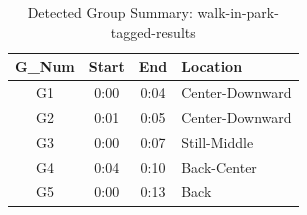 \begin{table}[H]
    \centering
    \caption{Detected Group Summary: walk-in-park-tagged-results}
    \label{tab:group-summary-4}
    \begin{tabular}{c c c l}
        \toprule
        \textbf{G\_Num} & \textbf{Start} & \textbf{End} & \textbf{Location} \\
        \midrule
        G1 & 0:00 & 0:04 & Center-Downward \\
        G2 & 0:01 & 0:05 & Center-Downward \\
        G3 & 0:00 & 0:07 & Still-Middle \\
        G4 & 0:04 & 0:10 & Back-Center \\
        G5 & 0:00 & 0:13 & Back \\
        \bottomrule
    \end{tabular}
\end{table}

